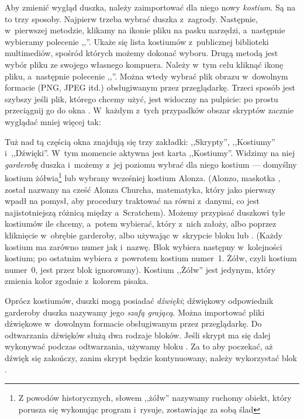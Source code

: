\documentclass{report}
\begin{document}
Aby zmienić wygląd duszka, należy zaimportować dla niego nowy \emph{kostium}. Są na to trzy sposoby. Najpierw trzeba wybrać duszka z~zagrody. Następnie, w~pierwszej metodzie, klikamy na ikonie pliku  na pasku narzędzi, a~następnie wybieramy polecenie ,,''. Ukaże się lista kostiumów z~publicznej biblioteki multimediów, spośród których możemy dokonać wyboru. Drugą metodą jest wybór pliku ze swojego własnego kompuera. Należy w~tym celu kliknąć ikonę pliku, a~następnie polecenie ,,''. Można wtedy wybrać plik obrazu w~dowolnym formacie (PNG, JPEG itd.) obsługiwanym przez przeglądarkę. Trzeci sposób jest szybszy jeśli plik, którego chcemy użyć, jest widoczny na pulpicie: po prostu przeciągnij go do okna . W~każdym z~tych przypadków obszar skryptów zacznie wyglądać mniej więcej tak:


Tuż nad tą częścią okna znajdują się trzy zakładki: ,,Skrypty'', ,,Kostiumy'' i~,,Dźwię\-ki''. W~tym momencie aktywna jest karta ,,Kostiumy''. Widzimy na niej \emph{garderobę} duszka i~możemy z~jej poziomu wybrać dla niego kostium --- domyślny kostium żółwia\footnote{Z powodów historycznych, słowem ,,żółw'' nazywamy ruchomy obiekt, który porusza się wykonując program i~rysuje, zostawiając za sobą ślad} lub wybrany wcześniej kostium Alonza. (Alonzo, maskotka , został nazwany na cześć Alonza Churcha, matematyka, który jako pierwszy wpadł na pomysł, aby procedury traktować na równi z~danymi, co jest najistotniejszą różnicą między  a~Scratchem). Możemy przypisać duszkowi tyle kostiumów ile chcemy, a~potem wybierać, który z~nich założy, albo poprzez kliknięcie w~obrębie garderoby, albo używając w~skrypcie bloku  lub . (Każdy kostium ma zarówno numer jak i~nazwę. Blok  wybiera następny w~kolejności kostium; po ostatnim wybiera z~powrotem kostium numer~1. Żółw, czyli kostium numer~0, jest przez blok  ignorowany). Kostium ,,Żółw'' jest jedynym, który zmienia kolor zgodnie z~kolorem pisaka.

Oprócz kostiumów, duszki mogą posiadać \emph{dźwięki}; dźwiękowy odpowiednik garderoby duszka nazywamy jego \emph{szafą grającą}. Można importować pliki dźwiękowe w~dowolnym formacie obsługiwanym przez przeglądarkę. Do odtwarzania dźwięków służą dwa rodzaje bloków. Jeśli skrypt ma się dalej wykonywać podczas odtwarzania, używamy bloku . Za to aby poczekać, aż dźwięk się zakończy, zanim skrypt będzie kontynuowany, należy wykorzystać blok .
\end{document}
